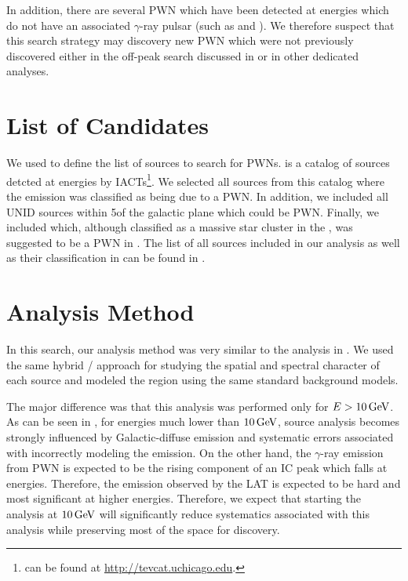 In addition, there are several \ac{PWN} which have been detected at \tev
energies which do not have an associated $\gamma$-ray pulsar (such as
 and ).  We therefore suspect that this search
strategy may discovery new \ac{PWN} which were not previously discovered
either in the off-peak search discussed in  or in other
dedicated analyses.

\section{List of \tev {} Candidates}



We used \tevcat to define the list of \tev sources to search
for \gev \acp{PWN}. \tevcat is a catalog of sources detcted at
\tev energies by \acp{IACT}\footnote{\tevcat can be found at
\url{http://tevcat.uchicago.edu}.}.  We selected all sources from
this catalog where the emission was classified as being due to a
\ac{PWN}. In addition, we included all \ac{UNID} sources within
5\degree of the galactic plane which could be \ac{PWN}.  Finally,
we included  which, although classified as a massive
star cluster in the \tevcat, was suggested to be a \ac{PWN} in
\cite{de-naurois_2013a_galactic-h.e.s.s.}. The list of all sources
included in our analysis as well as their classification in \tevcat can
be found in .

\section{Analysis Method}

In this search, our analysis method was very similar to the analysis
in . We used the same hybrid \pointlike/\gtlike
approach for studying the spatial and spectral character of each source
and modeled the region using the same standard background models.

The major difference was that this analysis
was performed only for $E>10\,\text{GeV}$.  As can be seen in
, for energies much lower than $10\,\text{GeV}$,
source analysis becomes strongly influenced by Galactic-diffuse
emission and systematic errors associated with incorrectly modeling
the emission. On the other hand, the $\gamma$-ray emission from \ac{PWN}
is expected to be the rising component of an \ac{IC} peak which falls
at \tev energies. Therefore, the emission observed by the \ac{LAT} is
expected to be hard and most significant at higher energies. Therefore,
we expect that starting the analysis  at $10\,\text{GeV}$ will
significantly reduce systematics associated with this analysis while
preserving most of the space for discovery.

